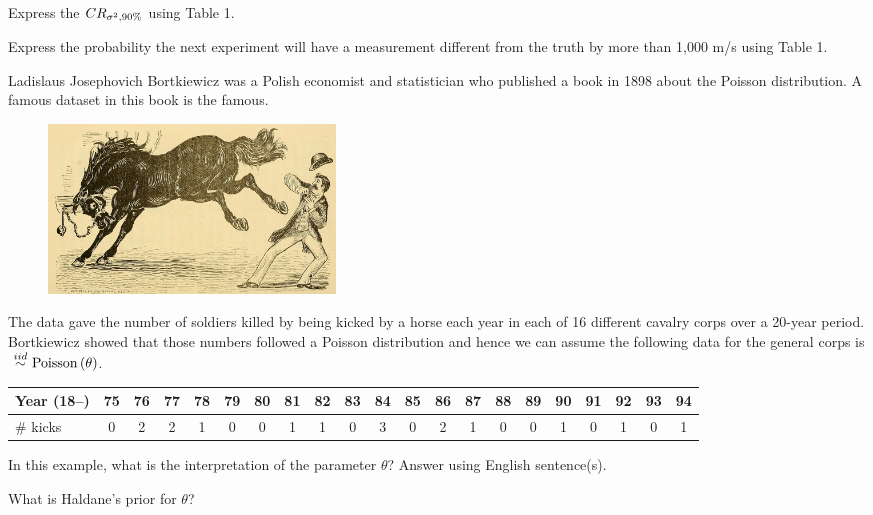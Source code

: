 \documentclass[12pt]{article}
\begin{document}
 Express the $CR_{\sigma^2, 90\%}$ using Table 1. 

 Express the probability the next experiment will have a measurement different from the truth by more than 1,000 m/s using Table 1. 

\eenum



\problem Ladislaus Josephovich Bortkiewicz was a Polish economist and statistician who published a book in 1898 about the Poisson distribution. A famous dataset in this book is the  famous. 


\begin{figure}[h]
\centering
\includegraphics[width=3in]{horse.png}
\end{figure}

\noindent The data gave the number of soldiers killed by being kicked by a horse each year in each of 16 different cavalry corps over a 20-year period. Bortkiewicz showed that those numbers followed a Poisson distribution and hence we can assume the following data for the general corps is $\iid \poisson{\theta}$.

\begin{table}[h]
\footnotesize
\begin{tabular}{l|cccccccccccccccccccc}
Year (18--)	& 75 & 76 & 77 & 78 & 79 & 80 & 81 & 82 & 83 & 84 & 85 & 86 & 87 & 88 & 89 & 90 & 91 & 92 & 93 & 94 \\ \hline
\# kicks &	0	& 2	& 2	& 1	& 0	& 0	& 1	& 1	& 0	& 3	& 0	& 2	& 1	& 0	& 0	& 1	& 0	& 1	& 0	& 1 \\
\end{tabular}
\end{table}

\benum

 In this example, what is the interpretation of the parameter $\theta$? Answer using English sentence(s). 

 What is Haldane's prior for $\theta$? 
\end{document}
